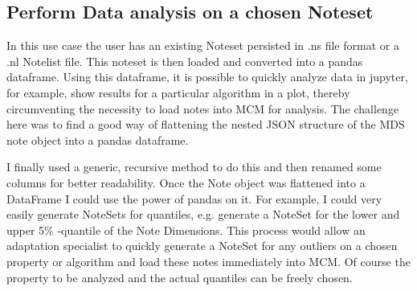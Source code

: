 \subsection{Perform Data analysis on a chosen Noteset}
In this use case the user has an existing Noteset persisted in .ns file format or a .nl Notelist file. This noteset is then loaded and converted into a pandas dataframe. Using this dataframe, it is possible to quickly analyze data in jupyter, for example, show results for a particular algorithm in a plot, thereby circumventing the necessity to load notes into MCM for analysis. The challenge here was to find a good way of flattening the nested JSON structure of the MDS note object into a pandas dataframe. \par I finally used a generic, recursive method to do this and then renamed some columns for better readability. Once the Note object was flattened into a DataFrame I could use the power of pandas on it. For example, I could very easily generate NoteSets for quantiles, e.g. generate a NoteSet for the lower and upper 5\% -quantile of the Note Dimensions. This process would allow an adaptation specialist to quickly generate a NoteSet for any outliers on a chosen property or algorithm and load these notes immediately into MCM. Of course the property to be analyzed and the actual quantiles can be freely chosen.

